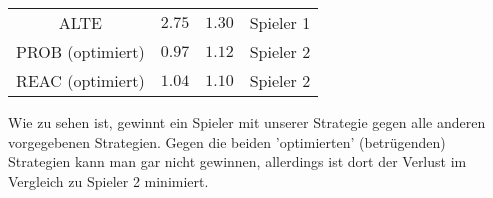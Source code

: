 \documentclass[12pt,a4paper]{article}
\begin{document}
\begin{enumerate}
\begin{center}
\begin{tabular}{c c c c}
        ALTE         &      $2.75$      &      $1.30$      & Spieler 1\\
   PROB (optimiert)  &      $0.97$      &      $1.12$      & Spieler 2\\
   REAC (optimiert)  &      $1.04$      &      $1.10$      & Spieler 2
\end{tabular}
\end{center}
Wie zu sehen ist, gewinnt ein Spieler mit unserer Strategie gegen alle anderen vorgegebenen Strategien.
Gegen die beiden 'optimierten' (betrügenden) Strategien kann man gar nicht gewinnen, allerdings ist dort der Verlust im Vergleich zu Spieler 2 minimiert.
\end{enumerate}
\end{document}
